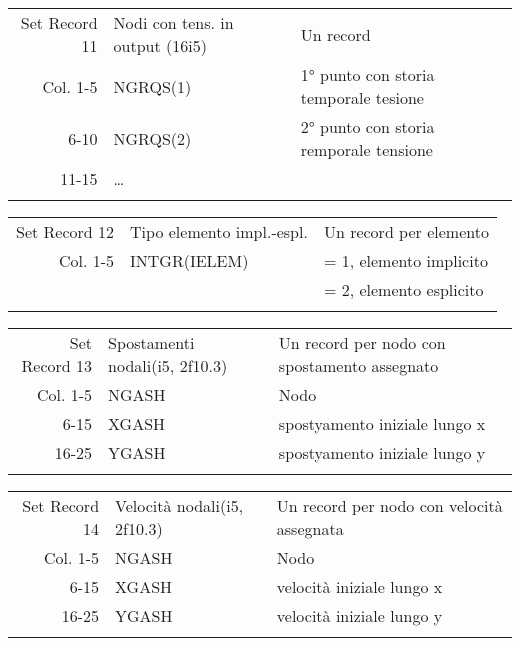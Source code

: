 \begin{tabular}{rll}
	Set Record 11& Nodi con tens. in output (16i5)& Un record                                         \\
	Col.  1-5    & NGRQS(1)                       & 1° punto con storia temporale tesione             \\
	6-10    & NGRQS(2)                       & 2° punto con storia remporale tensione            \\
	11-15        & \dots                          &                                                   \\
	&                                             &                                                   \\
\end{tabular}

\begin{tabular}{rll}
	Set Record 12& Tipo elemento impl.-espl.      & Un record per elemento                            \\
	Col.  1-5    & INTGR(IELEM)                   & = 1, elemento implicito                           \\
	&                                & = 2, elemento esplicito                           \\
	&                                &                                                   \\
\end{tabular}

\begin{tabular}{rll}
	Set Record 13& Spostamenti nodali(i5, 2f10.3) & Un record per nodo con spostamento assegnato      \\
	Col.  1-5    & NGASH                          & Nodo                                              \\
	6-15    & XGASH                          & spostyamento iniziale lungo x                     \\
	16-25    & YGASH                          & spostyamento iniziale lungo y                     \\
	&                                &                                                   \\
\end{tabular}

\begin{tabular}{rll}
	Set Record 14& Velocità nodali(i5, 2f10.3)    & Un record per nodo con velocità assegnata         \\
	Col.  1-5    & NGASH                          & Nodo                                              \\
	6-15    & XGASH                          & velocità iniziale lungo x                         \\
	16-25    & YGASH                          & velocità iniziale lungo y                         \\
	&                                &                                                   \\
\end{tabular}

